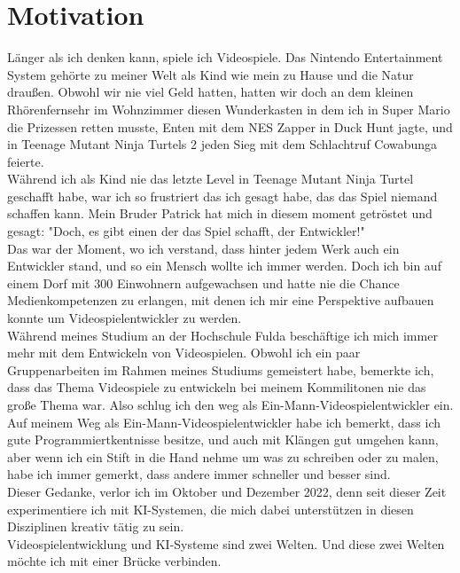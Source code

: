\section{Motivation}
Länger als ich denken kann, spiele ich Videospiele. Das Nintendo Entertainment System gehörte zu meiner Welt als Kind wie mein zu Hause und die Natur draußen. Obwohl wir nie viel Geld hatten, hatten wir doch an dem kleinen Rhörenfernsehr im Wohnzimmer diesen Wunderkasten in dem ich in Super Mario die Prizessen retten musste, Enten mit dem NES Zapper in Duck Hunt jagte, und in Teenage Mutant Ninja Turtels 2 jeden Sieg mit dem Schlachtruf Cowabunga feierte.
\\
Während ich als Kind nie das letzte Level in Teenage Mutant Ninja Turtel geschafft habe, war ich so frustriert das ich gesagt habe, das das Spiel niemand schaffen kann. Mein Bruder Patrick hat mich in diesem moment getröstet und gesagt: "Doch, es gibt einen der das Spiel schafft, der Entwickler!"
\\
Das war der Moment, wo ich verstand, dass hinter jedem Werk auch ein Entwickler stand, und so ein Mensch wollte ich immer werden. Doch ich bin auf einem Dorf mit 300 Einwohnern aufgewachsen und hatte nie die Chance Medienkompetenzen zu erlangen, mit denen ich mir eine Perspektive aufbauen konnte um Videospielentwickler zu werden.
\\
Während meines Studium an der Hochschule Fulda beschäftige ich mich immer mehr mit dem Entwickeln von Videospielen. Obwohl ich ein paar Gruppenarbeiten im Rahmen meines Studiums gemeistert habe, bemerkte ich, dass das Thema Videospiele zu entwickeln bei meinem Kommilitonen nie das große Thema war. Also schlug ich den weg als Ein-Mann-Videospielentwickler ein.
\\
Auf meinem Weg als Ein-Mann-Videospielentwickler habe ich bemerkt, dass ich gute Programmiertkentnisse besitze, und auch mit Klängen gut umgehen kann, aber wenn ich ein Stift in die Hand nehme um was zu schreiben oder zu malen, habe ich immer gemerkt, dass andere immer schneller und besser sind.
\\
Dieser Gedanke, verlor ich im Oktober und Dezember 2022, denn seit dieser Zeit experimentiere ich mit KI-Systemen, die mich dabei unterstützen in diesen Disziplinen kreativ tätig zu sein.
\\
Videospielentwicklung und KI-Systeme sind zwei Welten. Und diese zwei Welten möchte ich mit einer Brücke verbinden.
\\ 
